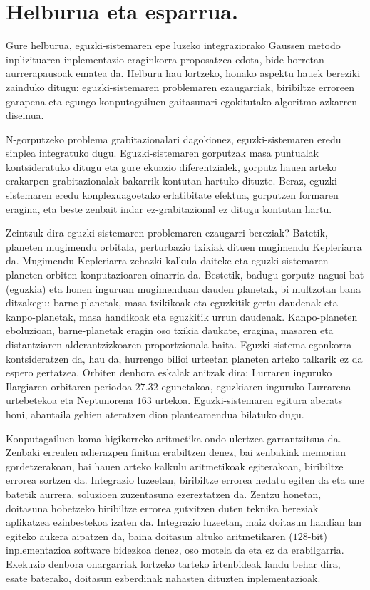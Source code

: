 \section{Helburua eta esparrua.}

Gure helburua, eguzki-sistemaren epe luzeko integraziorako Gaussen metodo inplizituaren inplementazio eraginkorra proposatzea edota, bide horretan aurrerapausoak ematea da. Helburu hau lortzeko, honako aspektu hauek bereziki zainduko ditugu: eguzki-sistemaren problemaren ezaugarriak, biribiltze erroreen garapena eta egungo konputagailuen gaitasunari egokitutako algoritmo azkarren diseinua.  

N-gorputzeko problema grabitazionalari dagokionez, eguzki-sistemaren eredu sinplea integratuko dugu. Eguzki-sistemaren gorputzak masa puntualak kontsideratuko ditugu eta gure ekuazio diferentzialek, gorputz hauen arteko erakarpen grabitazionalak bakarrik kontutan hartuko dituzte. Beraz, eguzki-sistemaren eredu konplexuagoetako erlatibitate efektua, gorputzen formaren eragina, eta beste zenbait indar ez-grabitazional ez ditugu kontutan hartu.

Zeintzuk dira eguzki-sistemaren problemaren ezaugarri bereziak? Batetik, planeten mugimendu orbitala, perturbazio txikiak dituen mugimendu Kepleriarra da. Mugimendu Kepleriarra  zehazki kalkula daiteke eta eguzki-sistemaren planeten orbiten konputazioaren oinarria da. Bestetik,  badugu gorputz nagusi bat (eguzkia) eta honen inguruan mugimenduan dauden planetak, bi multzotan bana ditzakegu: barne-planetak, masa txikikoak eta eguzkitik gertu daudenak eta kanpo-planetak, masa handikoak eta eguzkitik urrun daudenak. Kanpo-planeten eboluzioan, barne-planetak eragin oso txikia daukate, eragina, masaren eta distantziaren alderantzizkoaren proportzionala baita.  Eguzki-sistema egonkorra kontsideratzen da, hau da, hurrengo bilioi urteetan planeten arteko talkarik ez da espero gertatzea. Orbiten denbora eskalak anitzak dira; Lurraren inguruko Ilargiaren orbitaren periodoa $27.32$ egunetakoa, eguzkiaren inguruko Lurrarena urtebetekoa eta Neptunorena $163$ urtekoa.  Eguzki-sistemaren egitura aberats honi, abantaila gehien ateratzen dion planteamendua bilatuko dugu.
  
Konputagailuen koma-higikorreko aritmetika ondo ulertzea garrantzitsua da. Zenbaki errealen adierazpen finitua erabiltzen denez, bai zenbakiak memorian gordetzerakoan, bai hauen arteko kalkulu aritmetikoak egiterakoan, biribiltze errorea sortzen da. Integrazio luzeetan, biribiltze errorea hedatu egiten da eta une batetik aurrera, soluzioen zuzentasuna ezereztatzen da. Zentzu honetan, doitasuna hobetzeko biribiltze errorea gutxitzen duten teknika bereziak aplikatzea ezinbestekoa izaten da. Integrazio luzeetan, maiz doitasun handian lan egiteko aukera aipatzen da, baina doitasun altuko aritmetikaren ($128$-bit) inplementazioa software bidezkoa denez, oso motela da eta ez da erabilgarria. Exekuzio denbora onargarriak lortzeko tarteko irtenbideak landu behar dira, esate baterako, doitasun ezberdinak nahasten dituzten inplementazioak.       

